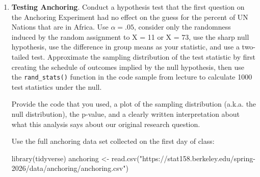 \documentclass[
  letterpaper,
  DIV=11,
  numbers=noendperiod]{scrartcl}
\newenvironment{Shaded}{\begin{snugshade}}{\end{snugshade}}
\newcommand{\FunctionTok}[1]{\textcolor[rgb]{0.28,0.35,0.67}{#1}}
\newcommand{\NormalTok}[1]{\textcolor[rgb]{0.00,0.23,0.31}{#1}}
\newcommand{\OtherTok}[1]{\textcolor[rgb]{0.00,0.23,0.31}{#1}}
\newcommand{\StringTok}[1]{\textcolor[rgb]{0.13,0.47,0.30}{#1}}
\begin{document}
\begin{enumerate}
\def\labelenumi{\arabic{enumi}.}
\setcounter{enumi}{6}
\item
  \textbf{Testing Anchoring}. Conduct a hypothesis test that the first
  question on the Anchoring Experiment had no effect on the guess for
  the percent of UN Nations that are in Africa. Use \(\alpha = .05\),
  consider only the randomness induced by the random assignment to X =
  11 or X = 73, use the sharp null hypothesis, use the difference in
  group means as your statistic, and use a two-tailed test. Approximate
  the sampling distribution of the test statistic by first creating the
  schedule of outcomes implied by the null hypothesis, then use the
  \texttt{rand\_stats()} function in the code sample from lecture to
  calculate 1000 test statistics under the null.

  Provide the code that you used, a plot of the sampling distribution
  (a.k.a. the null distribution), the p-value, and a clearly written
  interpretation about what this analysis says about our original
  research question.

  Use the full anchoring data set collected on the first day of class:

\begin{Shaded}
\begin{Highlighting}[]
\FunctionTok{library}\NormalTok{(tidyverse)}
\NormalTok{anchoring }\OtherTok{\textless{}{-}} \FunctionTok{read.csv}\NormalTok{(}\StringTok{"https://stat158.berkeley.edu/spring{-}2026/data/anchoring/anchoring.csv"}\NormalTok{)}
\end{Highlighting}
\end{Shaded}
\end{enumerate}
\end{document}

